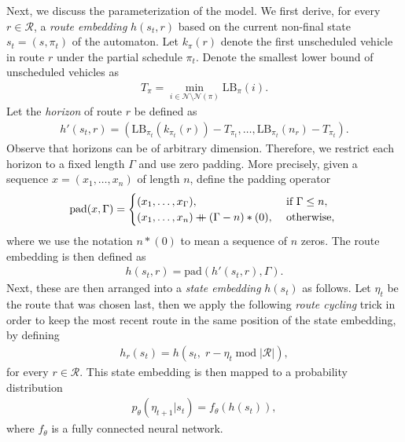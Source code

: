 \documentclass{article}
\newcommand\mdoubleplus{\mathbin{+\mkern-10mu+}}
\theoremstyle{definition}
\theoremstyle{plain}
\begin{document}
Next, we discuss the parameterization of the model. We first derive, for every
$r \in \mathcal{R}$, a \textit{route embedding} $h(s_{t}, r)$ based on the current non-final state
$s_{t} = (s, \pi_{t})$ of the automaton.
%
Let $k_{\pi}(r)$ denote the first unscheduled vehicle in route $r$ under the partial schedule $\pi_{t}$.
Denote the smallest lower bound of unscheduled vehicles as
\begin{align*}
  T_{\pi} = \min_{i \in \mathcal{N} \setminus \mathcal{N}(\pi)} \text{LB}_{\pi}(i) .
\end{align*}
Let the \textit{horizon} of route $r$ be defined as
\begin{align*}
  h'(s_{t}, r) = ( \text{LB}_{\pi_{t}}(k_{\pi_{t}}(r)) - T_{\pi_{t}}, \dots, \text{LB}_{\pi_{t}}(n_{r}) - T_{\pi_{t}} ) .
\end{align*}
%
Observe that horizons can be of arbitrary dimension. Therefore, we restrict each
horizon to a fixed length $\Gamma$ and use zero padding. More precisely, given a
sequence $x = (x_{1}, \dots, x_{n})$ of length $n$, define the padding
operator
\begin{align*}
  \text{pad}(x, \Gamma) = \begin{cases}
                            (x_{1}, \dots, x_{\Gamma}), &\text{ if } \Gamma \leq n,  \\
                            (x_{1}, \dots, x_{n}) \mdoubleplus (\Gamma - n) * (0), &\text{ otherwise, }
                            \end{cases}
\end{align*}
where we use the notation $n * (0)$ to mean a sequence of $n$ zeros.
%
The route embedding is then defined as
\begin{align*}
  h(s_{t}, r) = \text{pad}(h'(s_{t}, r), \Gamma).
\end{align*}
%
Next, these are then arranged into a \textit{state embedding}
$h(s_{t})$ as follows. Let $\eta_{t}$ be the route that was chosen last, then we
apply the following \textit{route cycling} trick in order to keep the most recent route in
the same position of the state embedding, by defining
\begin{align*}
  h_{r}(s_{t}) = h(s_{t}, \; r - \eta_{t} \; \mathrm{mod} \; |\mathcal{R}|) ,
\end{align*}
for every $r \in \mathcal{R}$.
%
This state embedding is then mapped to a probability distribution
\begin{align*}
  p_{\theta}(\eta_{t+1} | s_{t}) = f_{\theta}(h(s_{t})) ,
\end{align*}
where $f_{\theta}$ is a fully connected neural network.
\end{document}
